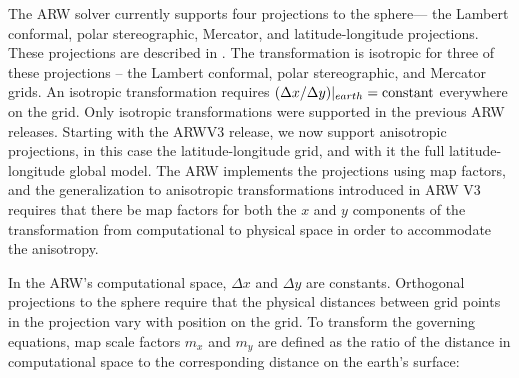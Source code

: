 The ARW solver currently supports four projections to the sphere--- the
Lambert conformal, polar stereographic, Mercator, and latitude-longitude
projections.  These projections are described in
\citet{haltiner_and_williams}.  The transformation is isotropic for
three of these projections -- the Lambert conformal, polar stereographic,
and Mercator grids.  An isotropic transformation requires $(\Delta
x/\Delta y)|_{earth} = \hbox{constant}$ everywhere on the grid.  Only
isotropic transformations were supported in the previous ARW releases.
Starting with the ARWV3 release, we now support anisotropic
projections, in this case the latitude-longitude grid, and with it the
full latitude-longitude global model.  The ARW implements the
projections using map factors, and the generalization to anisotropic
transformations introduced in ARW V3 requires that there be map factors
for both the $x$ and $y$ components of the transformation from
computational to physical space in order to accommodate the anisotropy.

In the ARW's computational space, $\Delta x$ and $\Delta y$ are
constants.  Orthogonal projections to the sphere require that
the physical distances between grid points in the projection vary with
position on the grid.  To transform the governing equations,
map scale factors $m_x$ and $m_y$ are defined as the ratio of the distance 
in computational space to the corresponding distance on the earth's surface:

